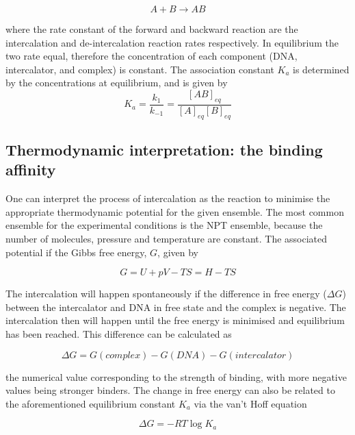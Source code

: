 \documentclass{report}
\begin{document}
\begin{equation}
  A + B \rightarrow AB
\end{equation}

where the rate constant of the forward and backward reaction are the intercalation and de-intercalation reaction rates respectively. In equilibrium the two rate equal, therefore the concentration of each component (DNA, intercalator, and complex) is constant. The association constant $K_a$ is determined by the concentrations at equilibrium, and is given by
\begin{equation}
  K_a = \frac{k_1}{k_{-1}} = \frac{[AB]_{eq}}{[A]_{eq} [B]_{eq}}
\end{equation}

\subsection{Thermodynamic interpretation: the binding affinity}

One can interpret the process of intercalation as the reaction to minimise the appropriate thermodynamic potential for the given ensemble. The most common ensemble for the experimental conditions is the NPT ensemble, because the number of molecules, pressure and temperature are constant. The associated potential if the Gibbs free energy, $G$, given by

\begin{equation}
  G = U + pV - TS = H - TS
\end{equation}

The intercalation will happen spontaneously if the difference in free energy ($\Delta G$) between the intercalator and DNA in free state and the complex is negative. The intercalation then will happen until the free energy is minimised and equilibrium has been reached. This difference can be calculated as

\begin{equation}
  \Delta G = G(complex) - G(DNA) - G(intercalator)
\end{equation} 

the numerical value corresponding to the strength of binding, with more negative values being stronger binders. The change in free energy can also be related to the aforementioned equilibrium constant $K_a$ via the van't Hoff equation

\begin{equation}
  \Delta G = - R T \log K_a
\end{equation}
\end{document}
